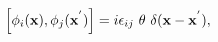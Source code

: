 \begin{equation}
   \left[ \phi_i ({\bf x}), \phi_j ({\bf x}^{'})\right] = i \epsilon_{ij} ~\theta~
   \delta ( {\bf x} -{\bf x}^{'}),
   \label{4}
   \end{equation}


